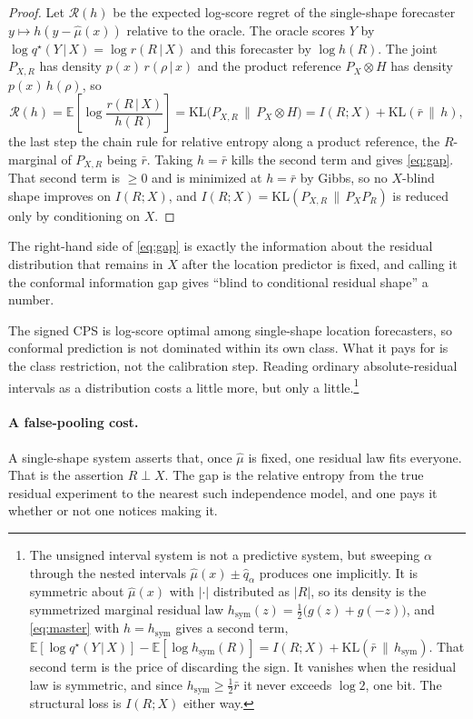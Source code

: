 \documentclass[11pt]{article}
\theoremstyle{definition}
\newcommand{\E}{\mathbb{E}}
\newcommand{\KL}{\mathrm{KL}}
\newcommand{\given}{\,\vert\,}
\begin{document}
\begin{proof}
Let $\mathcal{R}(h)$ be the expected log-score regret of the single-shape forecaster
$y\mapsto h(y-\hat\mu(x))$ relative to the oracle. The oracle scores $Y$ by
$\log q^\star(Y\given X)=\log r(R\given X)$ and this forecaster by $\log h(R)$. The joint
$P_{X,R}$ has density $p(x)\,r(\rho\given x)$ and the product reference $P_X\otimes H$ has
density $p(x)\,h(\rho)$, so
\begin{equation}\label{eq:master}
  \mathcal{R}(h)=\E\!\left[\log\frac{r(R\given X)}{h(R)}\right]
      =\KL\!\big(P_{X,R}\,\big\|\,P_X\otimes H\big)
      = I(R;X)+\KL(\bar r\,\|\,h),
\end{equation}
the last step the chain rule for relative entropy along a product reference, the $R$-marginal
of $P_{X,R}$ being $\bar r$. Taking $h=\bar r$ kills the second term and gives
\eqref{eq:gap}. That second term is $\ge 0$ and is minimized at $h=\bar r$ by Gibbs, so no
$X$-blind shape improves on $I(R;X)$, and $I(R;X)=\KL(P_{X,R}\,\|\,P_X P_R)$ is reduced only
by conditioning on $X$.
\end{proof}

The right-hand side of
\eqref{eq:gap} is exactly the information about the residual distribution that remains in
$X$ after the location predictor is fixed, and calling it the conformal information gap
gives ``blind to conditional residual shape'' a number. 

The signed CPS is log-score optimal among single-shape location forecasters, so conformal
prediction is not dominated within its own class. What it pays for is the class restriction,
not the calibration step. Reading ordinary absolute-residual intervals as a distribution
costs a little more, but only a little.\footnote{The unsigned interval system is not a
predictive system, but sweeping $\alpha$ through the nested intervals
$\hat\mu(x)\pm\hat q_\alpha$ produces one implicitly. It is symmetric about $\hat\mu(x)$
with $|{\cdot}|$ distributed as $|R|$, so its density is the symmetrized marginal residual
law $h_{\mathrm{sym}}(z)=\tfrac12\big(g(z)+g(-z)\big)$, and \eqref{eq:master} with
$h=h_{\mathrm{sym}}$ gives a second term,
$\E[\log q^\star(Y\given X)]-\E[\log h_{\mathrm{sym}}(R)]=I(R;X)+\KL(\bar r\,\|\,
h_{\mathrm{sym}})$. That second term is the price of discarding the sign. It vanishes when
the residual law is symmetric, and since $h_{\mathrm{sym}}\ge\tfrac12\bar r$ it never
exceeds $\log 2$, one bit. The structural loss is $I(R;X)$ either way.}

\paragraph{A false-pooling cost.} A single-shape system asserts that, once $\hat\mu$ is
fixed, one residual law fits everyone. That is the assertion $R\perp X$. The gap is the
relative entropy from the true residual experiment to the nearest such independence model,
and one pays it whether or not one notices making it.
\end{document}
